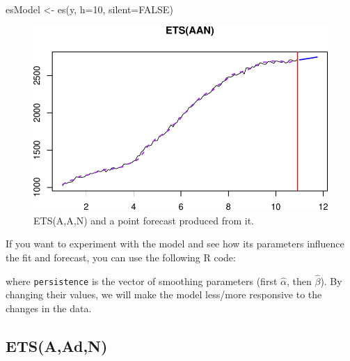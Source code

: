 \documentclass[
]{book}
\newenvironment{Shaded}{\begin{snugshade}}{\end{snugshade}}
\newcommand{\AttributeTok}[1]{\textcolor[rgb]{0.77,0.63,0.00}{#1}}
\newcommand{\ConstantTok}[1]{\textcolor[rgb]{0.00,0.00,0.00}{#1}}
\newcommand{\DecValTok}[1]{\textcolor[rgb]{0.00,0.00,0.81}{#1}}
\newcommand{\FloatTok}[1]{\textcolor[rgb]{0.00,0.00,0.81}{#1}}
\newcommand{\FunctionTok}[1]{\textcolor[rgb]{0.00,0.00,0.00}{#1}}
\newcommand{\NormalTok}[1]{#1}
\newcommand{\OtherTok}[1]{\textcolor[rgb]{0.56,0.35,0.01}{#1}}
\newcommand{\SpecialCharTok}[1]{\textcolor[rgb]{0.00,0.00,0.00}{#1}}
\theoremstyle{definition}
\theoremstyle{definition}
\theoremstyle{definition}
\theoremstyle{definition}
\theoremstyle{remark}
\begin{document}
\begin{Shaded}
\begin{Highlighting}[]
\NormalTok{esModel }\OtherTok{\textless{}{-}} \FunctionTok{es}\NormalTok{(y, }\AttributeTok{h=}\DecValTok{10}\NormalTok{, }\AttributeTok{silent=}\ConstantTok{FALSE}\NormalTok{)}
\end{Highlighting}
\end{Shaded}

\begin{figure}
\centering
\includegraphics{Svetunkov--2022----ADAM_files/figure-latex/ETSAANExampleForecast-1.pdf}
\caption{\label{fig:ETSAANExampleForecast}ETS(A,A,N) and a point forecast produced from it.}
\end{figure}

If you want to experiment with the model and see how its parameters influence the fit and forecast, you can use the following R code:

\begin{Shaded}
\end{Shaded}

where \texttt{persistence} is the vector of smoothing parameters (first \(\hat\alpha\), then \(\hat\beta\)). By changing their values, we will make the model less/more responsive to the changes in the data.

\hypertarget{ETSAAdN}{%
\subsection{ETS(A,Ad,N)}\label{ETSAAdN}}
\end{document}
